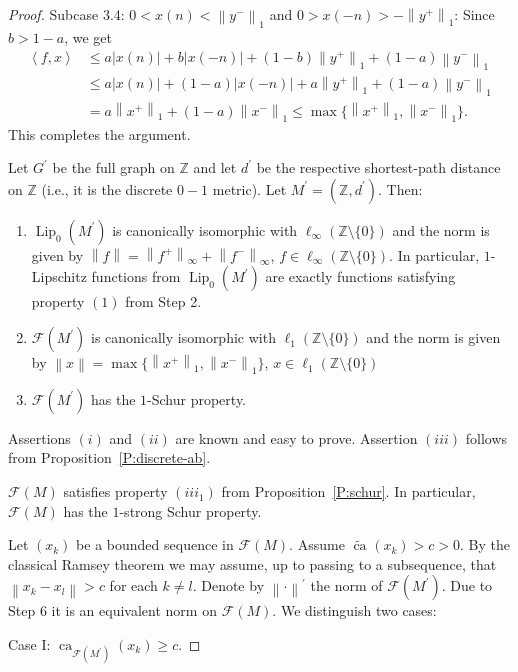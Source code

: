 \documentclass{amsart}
\numberwithin{equation}{section}
\theoremstyle{definition}
\def\F{\mathcal F}
\def\zet{\mathbb Z}
\def \Lip {\operatorname{Lip}}
\def\ip#1#2{\left\langle#1,#2\right\rangle}
\newcommand{\norm}[1]{\left\|#1\right\|}
\newcommand{\ca}[2][]{\operatorname{ca}_{#1}\left(#2\right)}
\newcommand{\wca}[2][]{\widetilde{\operatorname{ca}}_{#1}\left(#2\right)}
\newcommand{\abs}[1]{\left|#1\right|}
\begin{document}
\begin{proof}
Subcase 3.4: $0<x(n)<\norm{y^-}_1$ and $0>x(-n)> -\norm{y^+}_1$:
Since $b>1-a$, we get 
$$\begin{aligned}
\ip{f}{x}&\le a \abs{x(n)} + b \abs{x(-n)}+ (1-b)\norm{y^+}_1+(1-a)\norm{y^-}_1
\\& \le  a \abs{x(n)} + (1-a) \abs{x(-n)}+ a\norm{y^+}_1+(1-a)\norm{y^-}_1
\\&= a\norm{x^+}_1+(1-a)\norm{x^-}_1\le \max\{\norm{x^+}_1,\norm{x^-}_1\}.
\end{aligned}$$
This completes the argument.  

\smallskip

 Let $G^\prime$ be the full graph on $\zet$ and let $d^\prime$ be the respective shortest-path distance on $\zet$ (i.e., it is the discrete $0-1$ metric). Let $M^\prime=(\zet,d^\prime)$. Then:
\begin{enumerate}[$(i)$]
    \item $\Lip_0(M^\prime)$ is canonically isomorphic with $\ell_\infty(\zet\setminus\{0\})$ and the norm is given by $\norm{f}=\norm{f^+}_\infty+\norm{f^-}_\infty$, $f\in \ell_\infty(\zet\setminus\{0\})$. In particular, $1$-Lipschitz functions from $\Lip_0(M^\prime)$ are exactly functions satisfying property $(1)$ from Step 2.
    \item $\F(M^\prime)$ is canonically isomorphic with $\ell_1(\zet\setminus\{0\})$ and the norm is given by
    $\norm{x}=\max\{\norm{x^+}_1,\norm{x^-}_1\}$, $x\in\ell_1(\zet\setminus\{0\})$
    \item $\F(M^\prime)$ has the $1$-Schur property.
\end{enumerate}

\smallskip

Assertions $(i)$ and $(ii)$ are known and easy to prove. Assertion $(iii)$ follows from Proposition~\ref{P:discrete-ab}.

\smallskip

 $\F(M)$ satisfies property $(iii_1)$ from Proposition~\ref{P:schur}. In particular, $\F(M)$ has the $1$-strong Schur property.

\smallskip

Let $(x_k)$ be a bounded sequence in $\F(M)$. Assume $\wca{x_k}>c>0$. By the classical Ramsey theorem we may assume, up to passing to a subsequence, that $\norm{x_k-x_l}>c$ for each $k\ne l$. Denote by $\norm{\cdot}^\prime$ the norm of $\F(M^\prime)$. Due to Step 6 it is an equivalent norm on $\F(M)$. We distinguish two cases:

Case I: $\ca[\F(M^\prime)]{x_k}\ge c$.


\end{proof}
\end{document}
